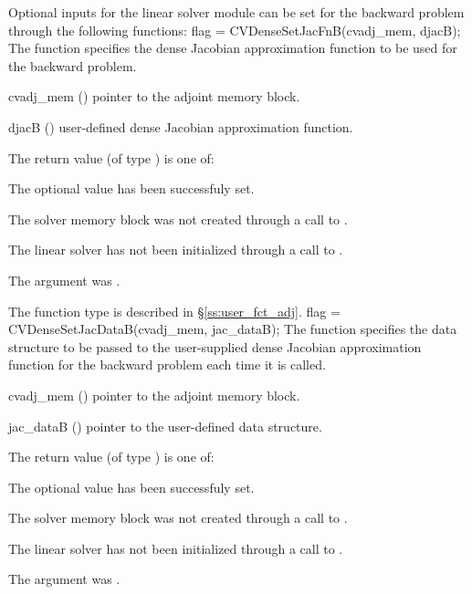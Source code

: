 Optional inputs for the {\cvdense} linear solver module can be set for the backward
problem through the following functions:
{
  flag = CVDenseSetJacFnB(cvadj\_mem, djacB);
}
{
  The function  specifies the dense Jacobian
  approximation function to be used for the backward problem.
}
{
  \begin{args}
  \item[cvadj\_mem] ()
    pointer to the adjoint memory block.
  \item[djacB] ()
    user-defined dense Jacobian approximation function.
  \end{args}
}
{
  The return value  (of type ) is one of:
  \begin{args}
  \item[\Id{CVDENSE\_SUCCESS}] 
    The optional value has been successfuly set.
  \item[\Id{CVDENSE\_MEM\_NULL}]
    The {\cvodes} solver memory block was not created through a call to .
  \item[\Id{CVDENSE\_LMEM\_NULL}]
    The {\cvdense} linear solver has not been initialized through a call to .
  \item[\Id{CV\_ADJMEM\_NULL}]
    The  argument was .
  \end{args}
}
{
  The function type  is described in \S\ref{ss:user_fct_adj}.
}
{
  flag = CVDenseSetJacDataB(cvadj\_mem, jac\_dataB);
}
{
  The function  specifies the data structure
  to be passed to the user-supplied dense Jacobian approximation 
  function for the backward problem each time it is called.
}
{
  \begin{args}
  \item[cvadj\_mem] ()
    pointer to the adjoint memory block.
  \item[jac\_dataB] ()
    pointer to the user-defined data structure.
  \end{args}
}
{
  The return value  (of type ) is one of:
  \begin{args}
  \item[\Id{CVDENSE\_SUCCESS}] 
    The optional value has been successfuly set.
  \item[\Id{CVDENSE\_MEM\_NULL}]
    The {\cvodes} solver memory block was not created through a call to .
  \item[\Id{CVDENSE\_LMEM\_NULL}]
    The {\cvdense} linear solver has not been initialized through a call to .
  \item[\Id{CV\_ADJMEM\_NULL}]
    The  argument was .
  \end{args}
}
